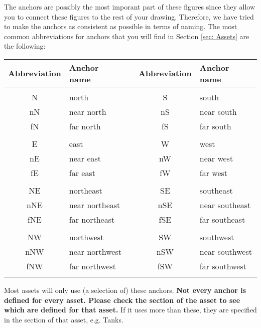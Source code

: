 The anchors are possibly the most imporant part of these figures since they allow you to connect these figures to the rest of your drawing. Therefore, we have tried to make the anchors as consistent as possible in terms of naming. The most common abbreviations for anchors that you will find in Section \ref{sec: Assets} are the following:

\begin{center}
    \begin{tabular}{c|lcc|l}
        Abbreviation & Anchor name & & Abbreviation & Anchor name \\
        \hline & & & & \\
        N & north & & S & south\\
        nN & near north & & nS & near south \\
        fN & far north & & fS & far south \\
        & & & & \\
        E & east & & W & west \\
        nE & near east & & nW & near west \\
        fE & far east  & & fW & far west \\
        & & & & \\
        NE & northeast & &  SE & southeast \\
        nNE & near northeast & &  nSE & near southeast \\
        fNE & far northeast & &  fSE & far southeast \\
        & & & & \\
        NW & northwest & & SW & southwest \\
        nNW & near northwest & &  nSW & near southwest \\
        fNW & far northwest & &  fSW & far southwest \\
        & & & & \\
    \end{tabular}
\end{center}

Most assets will only use (a selection of) these anchors. \textbf{Not every anchor is defined for every asset. Please check the section of the asset to see which are defined for that asset.}  If it uses more than these, they are specified in the section of that asset, e.g. Tanks. 